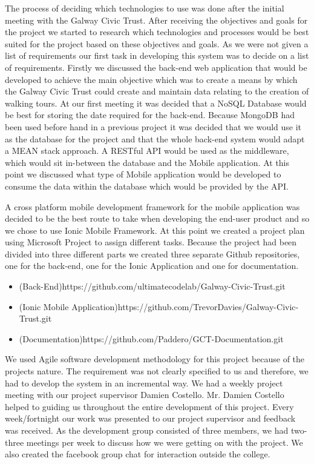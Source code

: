 The process of deciding which technologies to use was done after the initial meeting with the Galway Civic Trust. After receiving the objectives and goals for the project we started to research which technologies and processes would be best suited for the project based on these objectives and goals. As we were not given a list of requirements our first task in developing this system was to decide on a list of requirements. Firstly we discussed the back-end web application that would be developed to achieve the main objective which was to create a means by which the Galway Civic Trust could create and maintain data relating to the creation of walking tours. At our first meeting it was decided that a NoSQL Database would be best for storing the date required for the back-end. Because MongoDB had been used before hand in a previous project it was decided that we would use it as the database for the project and that the whole back-end system would adapt a MEAN stack approach. A RESTful API would be used as the middleware, which would sit in-between the database and the Mobile application.  At this point we discussed what type of Mobile application would be developed to consume the data within the database which would be provided by the API.

A cross platform mobile development framework for the mobile application was decided to be the best route to take when developing the end-user product and so we chose to use Ionic Mobile Framework. At this point we created a project plan using Microsoft Project to assign different tasks. Because the project had been divided into three different parts we created three separate Github repositories, one for the back-end, one for the Ionic Application and one for documentation. 
\begin{itemize}
	\item{(Back-End)https://github.com/ultimatecodelab/Galway-Civic-Trust.git}
	\item{(Ionic Mobile Application)https://github.com/TrevorDavies/Galway-Civic-Trust.git}
	\item{(Documentation)https://github.com/Paddero/GCT-Documentation.git}
\end{itemize}

We used Agile software development methodology for this project because of the projects nature. The requirement was not clearly specified to us and therefore, we had to develop the system in an incremental way. We had a weekly project meeting with our project supervisor Damien Costello. Mr. Damien Costello helped to guiding us throughout the entire development of this project. Every week/fortnight  our work was presented to our project supervisor and feedback was received.  As the development group consisted of three members, we had two-three meetings per week to discuss how we were getting on with  the project. We also created the facebook group chat for interaction outside the college. 




